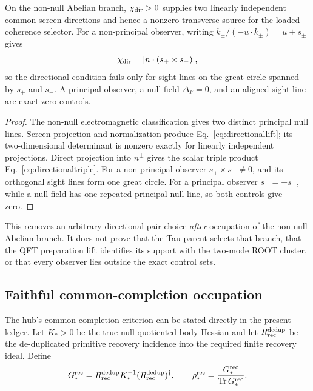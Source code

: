 \begin{proposition}
On the non-null Abelian branch, $\chi_{\rm dir}>0$ supplies two linearly
independent common-screen directions and hence a nonzero transverse source
for the loaded coherence selector.  For a non-principal observer, writing
$k_\pm/(-u\cdot k_\pm)=u+s_\pm$ gives
\begin{equation}
\chi_{\rm dir}=|n\cdot(s_+\times s_-)|,
\label{eq:directionaltriple}
\end{equation}
so the directional condition fails only for sight lines on the great circle
spanned by $s_+$ and $s_-$.  A principal observer, a null field
$\Delta_F=0$, and an aligned sight line are exact zero controls.
\end{proposition}

\begin{proof}
The non-null electromagnetic classification gives two distinct principal
null lines.  Screen projection and normalization produce
Eq.~\eqref{eq:directionallift}; its two-dimensional determinant is nonzero
exactly for linearly independent projections.  Direct projection into
$n^\perp$ gives the scalar triple product
Eq.~\eqref{eq:directionaltriple}.  For a non-principal observer
$s_+\times s_-\neq0$, and its orthogonal sight lines form one great circle.
For a principal observer $s_-=-s_+$, while a null field has one repeated
principal null line, so both controls give zero.
\end{proof}

This removes an arbitrary directional-pair choice \emph{after} occupation of
the non-null Abelian branch.  It does not prove that the Tau parent selects
that branch, that the QFT preparation lift identifies its support with the
two-mode ROOT cluster, or that every observer lies outside the exact control
sets.

\subsection{Faithful common-completion occupation}

The hub's common-completion criterion can be stated directly in the present
ledger.  Let $K_*>0$ be the true-null-quotiented body Hessian and let
$R_{\rm rec}^{\rm dedup}$ be the de-duplicated primitive recovery incidence
into the required finite recovery ideal.  Define
\begin{equation}
G_*^{\rm rec}=R_{\rm rec}^{\rm dedup}K_*^{-1}
(R_{\rm rec}^{\rm dedup})^\dagger,
\qquad
\rho_*^{\rm rec}=\frac{G_*^{\rm rec}}{\operatorname{Tr}G_*^{\rm rec}}.
\label{eq:faithfulcompletion}
\end{equation}

